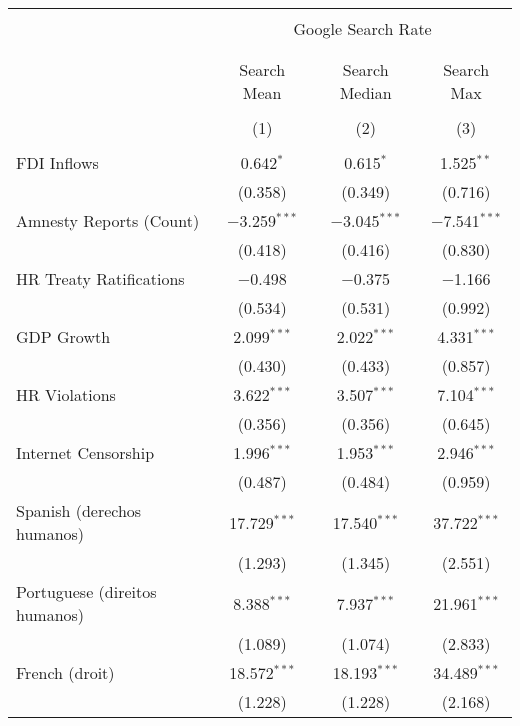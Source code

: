 
\begin{table}[!htbp] \centering 
  \caption{} 
  \label{} 
\begin{tabular}{@{\extracolsep{5pt}}lccc} 
\\[-1.8ex]\hline 
\hline \\[-1.8ex] 
 & \multicolumn{3}{c}{Google Search Rate} \\ 
\cline{2-4} 
\\[-1.8ex] & \multicolumn{3}{c}{ } \\ 
 & Search Mean & Search Median & Search Max \\ 
\\[-1.8ex] & (1) & (2) & (3)\\ 
\hline \\[-1.8ex] 
 FDI Inflows & 0.642$^{*}$ & 0.615$^{*}$ & 1.525$^{**}$ \\ 
  & (0.358) & (0.349) & (0.716) \\ 
  Amnesty Reports (Count) & $-$3.259$^{***}$ & $-$3.045$^{***}$ & $-$7.541$^{***}$ \\ 
  & (0.418) & (0.416) & (0.830) \\ 
  HR Treaty Ratifications & $-$0.498 & $-$0.375 & $-$1.166 \\ 
  & (0.534) & (0.531) & (0.992) \\ 
  GDP Growth & 2.099$^{***}$ & 2.022$^{***}$ & 4.331$^{***}$ \\ 
  & (0.430) & (0.433) & (0.857) \\ 
  HR Violations & 3.622$^{***}$ & 3.507$^{***}$ & 7.104$^{***}$ \\ 
  & (0.356) & (0.356) & (0.645) \\ 
  Internet Censorship & 1.996$^{***}$ & 1.953$^{***}$ & 2.946$^{***}$ \\ 
  & (0.487) & (0.484) & (0.959) \\ 
  Spanish (derechos humanos) & 17.729$^{***}$ & 17.540$^{***}$ & 37.722$^{***}$ \\ 
  & (1.293) & (1.345) & (2.551) \\ 
  Portuguese (direitos humanos) & 8.388$^{***}$ & 7.937$^{***}$ & 21.961$^{***}$ \\ 
  & (1.089) & (1.074) & (2.833) \\ 
  French (droit) & 18.572$^{***}$ & 18.193$^{***}$ & 34.489$^{***}$ \\ 
  & (1.228) & (1.228) & (2.168) \\ 

\end{tabular}
\end{table}
